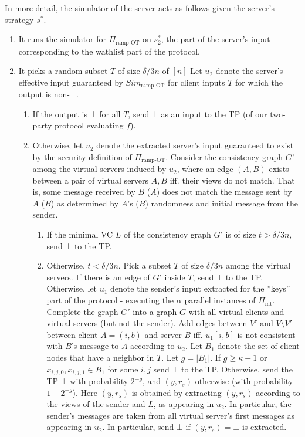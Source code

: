 \documentclass{llncs}
\newcommand{\INT}{\Pi_{\operatorname{int}}}
\begin{document}
{In more detail, the simulator of the server acts as follows given the server's strategy $s^*$.
\begin{enumerate}
	\item It runs the simulator for $\Pi_{\text{ramp-OT}}$ on $s^*_2$, the part of the server's input corresponding to the wathlist part of the protocol.
	\item It picks a random  subset $T$ of size $\delta/3 n$ of $[n]$ Let $u_2$ denote the server's effective input guaranteed by $Sim_{\text{ramp-OT}}$ for client inputs $T$ for which the output is non-$\bot$. 
	\begin{enumerate}
	\item If the output is $\bot$ for all $T$, send $\bot$ as an input to the TP (of our two-party protocol evaluating $f$).
	\item Otherwise, let $u_2$ denote the extracted server's input guaranteed to exist by the security definition of $\Pi_{\text{ramp-OT}}$.
	Consider the consistency graph $G$' among the virtual servers induced by $u_2$, where an edge $(A,B)$ exists between a pair of virtual servers $A,B$ iff. their views do not match. That is, some message received by $B$ ($A$) does not match the message sent by $A$ ($B$) as determined by $A$'s ($B$) randomness and initial message from the sender.
	\begin{enumerate}
		\item If the minimal VC $L$ of the consistency graph $G'$ is of size $t>\delta/3 n$, send $\bot$ to the TP.
		\item Otherwise, $t<\delta/3 n$. Pick a subset $T$ of size $\delta/3 n$ among the virtual servers. If there is an edge of $G'$ inside $T$, send $\bot$ to the TP. Otherwise, let $u_1$ denote the sender's input extracted for the ''keys'' part of the protocol - executing the $\alpha$ parallel instances of $\INT$. 
		Complete the graph $G'$ into a graph $G$ with all virtual clients and virtual servers (but not the sender). Add edges between $V'$ and $V\setminus{V'}$ between client $A=(i,b)$ and server $B$ iff. $u_1[i,b]$ is not consistent with $B$'s message to $A$ according to $u_2$. 
		Let $B_1$ denote the set of client nodes that have a neighbor in $T$. Let $g=|B_1|$. If $g\geq \kappa+1$ or $x_{i,j,0},x_{i,j,1}\in B_1$ for some $i,j$ send $\bot$ to the TP. Otherwise, send the TP $\bot$ with probability $2^{-g}$, and $(y,r_s)$ otherwise (with probability $1-2^{-g}$). Here $(y,r_s)$ is obtained by extracting $(y,r_s)$ according to the views of the sender and $L$, as appearing in $u_2$. In particular, the sender's messages are taken from all virtual server's first messages as appearing in $u_2$. In particular, send $\bot$ if $(y,r_s)=\bot$ is extracted.

\end{enumerate}
\end{enumerate}
\end{enumerate}}
\end{document}
